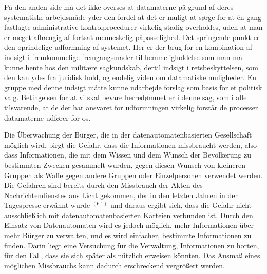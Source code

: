 {På den anden side må det ikke overses at datamaterne på grund af deres systematiske arbejdsmåde yder den fordel at det er muligt at sørge for at én gang fastlagte administrative kontrolprocedurer virkelig stadig overholdes, uden at man er meget afhængig af fortsat menneskelig påpasselighed. Det springende punkt er den oprindelige udformning af systemet. Her er der brug for en kombination af indsigt i fremkommelige fremgangsmåder til hemmeligholdelse som man må kunne hente hos den militære sagkundskab, dertil indsigt i retsbeskyttelsen, som den kan ydes fra juridisk hold, og endelig viden om datamatiske muligheder. En gruppe med denne indsigt måtte kunne udarbejde forslag som basis for et politisk valg. Betingelsen for at vi skal bevare herredømmet er i denne sag, som i alle tilsvarende, at de der har ansvaret for udformningen virkelig forstår de processer datamaterne udfører for os.
}{
Die Überwachung der Bürger, die in der datenautomatenbasierten Gesellschaft möglich wird, birgt die Gefahr, dass die Informationen missbraucht werden, also dass Informationen, die mit dem Wissen und dem Wunsch der Bevölkerung zu bestimmten Zwecken gesammelt wurden, gegen diesen Wunsch von kleineren Gruppen als Waffe gegen andere Gruppen oder Einzelpersonen verwendet werden. Die Gefahren sind bereits durch den Missbrauch der Akten des Nachrichtendienstes ans Licht gekommen, der in den letzten Jahren in der Tagespresse erwähnt wurde $^{(6.1)}$ und daraus ergibt sich, dass die Gefahr nicht ausschließlich mit datenautomatenbasierten Karteien verbunden ist. Durch den Einsatz von Datenautomaten wird es jedoch möglich, mehr Informationen über mehr Bürger zu verwalten, und es wird einfacher, bestimmte Informationen zu finden. Darin liegt eine Versuchung für die Verwaltung, Informationen zu horten, für den Fall, dass sie sich später als nützlich erweisen könnten. Das Ausmaß eines möglichen Missbrauchs kann dadurch erschreckend vergrößert werden.

}
